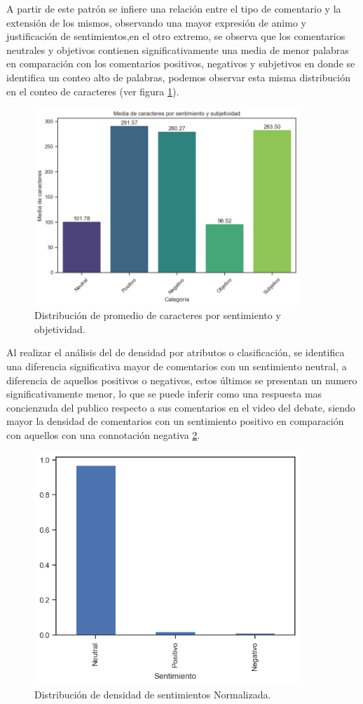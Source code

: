 A partir de este patrón se infiere una relación entre el tipo de comentario y la extensión de los mismos, observando una mayor expresión de animo y justificación de sentimientos,en el otro extremo, se observa que los comentarios neutrales y objetivos contienen significativamente una media de menor palabras en comparación con los comentarios positivos, negativos y subjetivos en donde se identifica un conteo alto de palabras, podemos observar esta misma distribución en el conteo de caracteres (ver figura \ref{fig:promediodecaracteres}).

\begin{figure}[!h]
	\centering
	\includegraphics[width=10cm]{Images/Promedio_de_caracteres}
	\caption{Distribución de promedio de caracteres por sentimiento y objetividad.}
	\label{fig:promediodecaracteres}
\end{figure}

Al realizar el análisis del de densidad por atributos o clasificación, se identifica una diferencia significativa mayor de comentarios con un sentimiento neutral, a diferencia de aquellos positivos o negativos, estos últimos se presentan un numero significativamente menor, lo que se puede inferir como una respuesta mas concienzuda del publico respecto a sus comentarios en el video del debate, siendo mayor la densidad de comentarios con un sentimiento positivo en comparación con aquellos con una connotación negativa \ref{fig:DDSN}.
\clearpage
\begin{figure}[!h]
	\centering
	\includegraphics[width=10cm]{Images/Densidad_sentimientos}
	\caption{Distribución de densidad de sentimientos Normalizada.}
	\label{fig:DDSN}
\end{figure}

